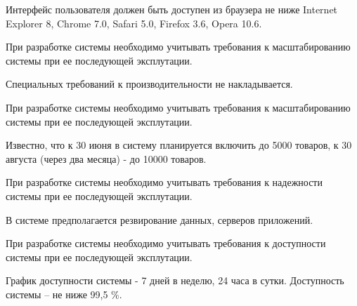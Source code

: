 

Интерфейс пользователя должен быть доступен из браузера не ниже Internet Explorer 8, Chrome 7.0, Safari 5.0, Firefox 3.6, Opera 10.6.


При разработке системы необходимо учитывать требования к масштабированию системы при ее последующей эксплутации. 

Специальных требований к производительности не накладывается.



При разработке системы необходимо учитывать требования к масштабированию системы при ее последующей эксплутации. 

Известно, что к 30 июня в систему планируется включить до 5000 товаров, к 30 августа (через два месяца) - до 10000 товаров. 


При разработке системы необходимо учитывать требования к надежности системы при ее последующей эксплутации. 

В системе предполагается резвирование данных, серверов приложений. 


При разработке системы необходимо учитывать требования к доступности системы при ее последующей эксплутации. 

График доступности системы - 7 дней в неделю, 24 часа в сутки. 
Доступность системы -- не ниже 99,5 \%. 

